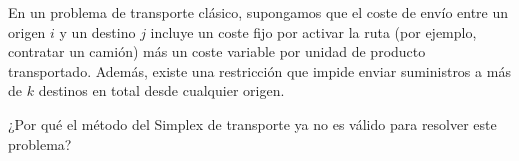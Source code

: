 En un problema de transporte clásico, supongamos que el coste de envío entre un origen $i$ y un destino $j$ incluye un coste fijo por activar la ruta (por ejemplo, contratar un camión) más un coste variable por unidad de producto transportado. Además, existe una restricción que impide enviar suministros a más de $k$ destinos en total desde cualquier origen. 

¿Por qué el método del Simplex de transporte ya no es válido para resolver este problema?

